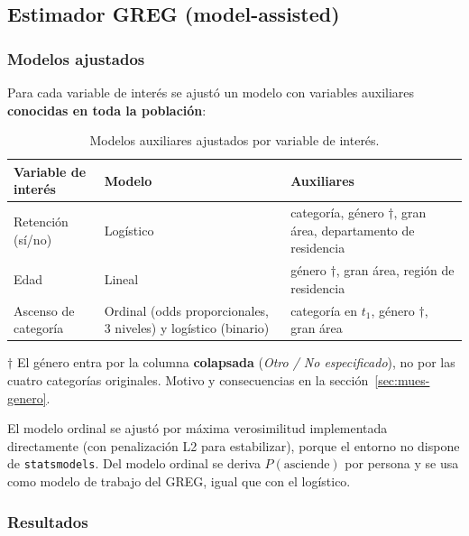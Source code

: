 \subsection{Estimador GREG (model-assisted)}
\label{sec:mues-greg}

\subsubsection{Modelos ajustados}

Para cada variable de interés se ajustó un modelo con variables auxiliares
\textbf{conocidas en toda la población}:

\begin{table}[H]
  \centering
  \small
  \caption{Modelos auxiliares ajustados por variable de interés.}
  \label{tab:mues-modelos}
  \begin{tabular}{@{}p{3.6cm}p{3.4cm}p{8cm}@{}}
    \toprule
    \textbf{Variable de interés} & \textbf{Modelo} & \textbf{Auxiliares} \\
    \midrule
    Retención (sí/no) & Logístico & categoría, género $\dagger$, gran área,
      departamento de residencia \\
    Edad & Lineal & género $\dagger$, gran área, región de residencia \\
    Ascenso de categoría & Ordinal (odds proporcionales, 3 niveles) y logístico
      (binario) & categoría en $t_1$, género $\dagger$, gran área \\
    \bottomrule
  \end{tabular}

  \smallskip
  {\footnotesize $\dagger$ El género entra por la columna \textbf{colapsada}
  (\emph{Otro / No especificado}), no por las cuatro categorías originales.
  Motivo y consecuencias en la sección~\ref{sec:mues-genero}.}
\end{table}

El modelo ordinal se ajustó por máxima verosimilitud implementada directamente
(con penalización L2 para estabilizar), porque el entorno no dispone de
\texttt{statsmodels}. Del modelo ordinal se deriva $P(\text{asciende})$ por
persona y se usa como modelo de trabajo del GREG, igual que con el logístico.

\subsubsection{Resultados}

